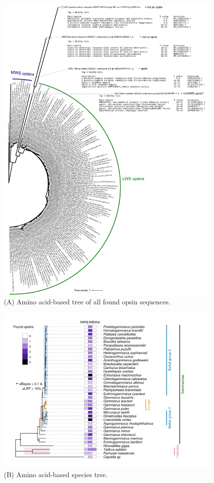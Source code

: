 \documentclass{article}
\begin{document}
\begin{figure}[H] 
	\vskip -18mm
	\includegraphics[scale=0.85]{FigS2a_opsin_tree.pdf}
	\caption{(A) Amino acid-based tree of all found opsin sequences.} 
\end{figure}

\begin{figure}[H] 
	\ContinuedFloat
	\includegraphics[scale=0.85]{FigS2_aa_tree.png}
	\caption{(B) Amino acid-based species tree.} 
\end{figure}
\end{document}
